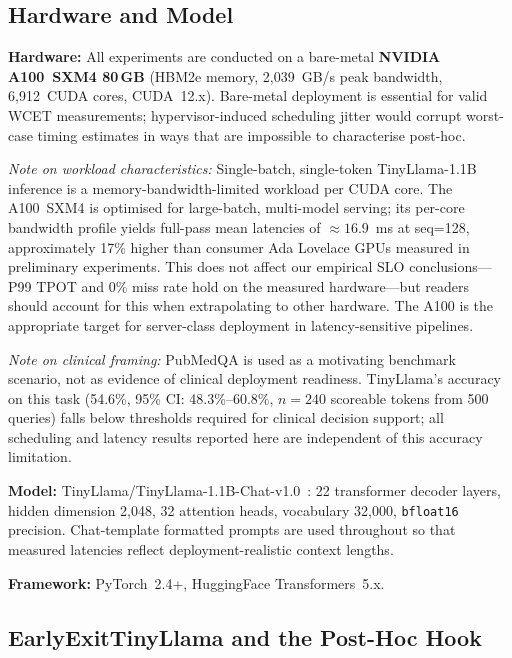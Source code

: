\documentclass[conference]{IEEEtran}
\begin{document}
\subsection{Hardware and Model}

\textbf{Hardware:}
All experiments are conducted on a bare-metal
\textbf{NVIDIA A100~SXM4 80\,GB} (HBM2e memory, 2{,}039~GB/s peak bandwidth,
6{,}912~CUDA cores, CUDA~12.x).
Bare-metal deployment is essential for valid WCET measurements;
hypervisor-induced scheduling jitter would corrupt worst-case timing
estimates in ways that are impossible to characterise post-hoc.

\smallskip
\noindent\textit{Note on workload characteristics:}
Single-batch, single-token TinyLlama-1.1B inference is a
memory-bandwidth-limited workload per CUDA core.
The A100~SXM4 is optimised for large-batch, multi-model serving;
its per-core bandwidth profile yields full-pass mean latencies of
${\approx}16.9$~ms at seq=128, approximately 17\% higher than
consumer Ada Lovelace GPUs measured in preliminary experiments.
This does not affect our empirical SLO conclusions---P99 TPOT and 0\%
miss rate hold on the measured hardware---but readers should account
for this when extrapolating to other hardware.
The A100 is the appropriate target for server-class deployment in latency-sensitive pipelines.

\smallskip\noindent\textit{Note on clinical framing:}
PubMedQA is used as a motivating benchmark scenario, not as evidence of
clinical deployment readiness. TinyLlama's accuracy on this task
(54.6\%, 95\% CI: 48.3\%--60.8\%, $n{=}240$ scoreable tokens from 500
queries) falls below thresholds required for clinical decision support;
all scheduling and latency results reported here are independent of
this accuracy limitation.

\smallskip\noindent\textbf{Model:}
TinyLlama/TinyLlama-1.1B-Chat-v1.0~\cite{zhang2024tinyllama}: 22
transformer decoder layers, hidden dimension 2{,}048,
32 attention heads, vocabulary 32{,}000, \texttt{bfloat16} precision.
Chat-template formatted prompts are used throughout so that measured
latencies reflect deployment-realistic context lengths.

\smallskip\noindent\textbf{Framework:}
PyTorch~2.4+, HuggingFace Transformers~5.x.

\subsection{EarlyExitTinyLlama and the Post-Hoc Hook}
\end{document}
